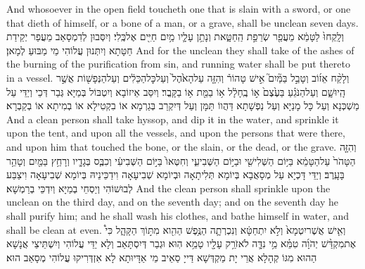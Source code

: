 {And whosoever in the open field toucheth one that is slain with a sword, or one that dieth of himself, or a bone of a man, or a grave, shall be unclean seven days.}{}
{וְלָֽקְחוּ֙ לַטָּמֵ֔א מֵעֲפַ֖ר שְׂרֵפַ֣ת הַֽחַטָּ֑את וְנָתַ֥ן עָלָ֛יו מַ֥יִם חַיִּ֖ים אֶל\maqqaf כֶּֽלִי׃}
{וְיִסְּבוּן לְדִמְסָאַב מֵעֲפַר יְקֵידַת חַטָּתָא וְיִתְּנוּן עֲלוֹהִי מֵי מַבּוּעַ לְמָאן׃}
{And for the unclean they shall take of the ashes of the burning of the purification from sin, and running water shall be put thereto in a vessel.}{}
{וְלָקַ֨ח אֵז֜וֹב וְטָבַ֣ל בַּמַּ֘יִם֮ אִ֣ישׁ טָהוֹר֒ וְהִזָּ֤ה עַל\maqqaf הָאֹ֙הֶל֙ וְעַל\maqqaf כׇּל\maqqaf הַכֵּלִ֔ים וְעַל\maqqaf הַנְּפָשׁ֖וֹת אֲשֶׁ֣ר הָֽיוּ\maqqaf שָׁ֑ם וְעַל\maqqaf הַנֹּגֵ֗עַ בַּעֶ֙צֶם֙ א֣וֹ בֶֽחָלָ֔ל א֥וֹ בַמֵּ֖ת א֥וֹ בַקָּֽבֶר׃}
{וְיִסַּב אֵיזוֹבָא וְיִטְבּוֹל בְּמַיָּא גְּבַר דְּכֵי וְיַדֵּי עַל מַשְׁכְּנָא וְעַל כָּל מָנַיָּא וְעַל נַפְשָׁתָא דַּהֲווֹ תַּמָּן וְעַל דְּיִקְרַב בְּגַרְמָא אוֹ בִקְטִילָא אוֹ בְמִיתָא אוֹ בְקַבְרָא׃}
{And a clean person shall take hyssop, and dip it in the water, and sprinkle it upon the tent, and upon all the vessels, and upon the persons that were there, and upon him that touched the bone, or the slain, or the dead, or the grave.}{}
{וְהִזָּ֤ה הַטָּהֹר֙ עַל\maqqaf הַטָּמֵ֔א בַּיּ֥וֹם הַשְּׁלִישִׁ֖י וּבַיּ֣וֹם הַשְּׁבִיעִ֑י וְחִטְּאוֹ֙ בַּיּ֣וֹם הַשְּׁבִיעִ֔י וְכִבֶּ֧ס בְּגָדָ֛יו וְרָחַ֥ץ בַּמַּ֖יִם וְטָהֵ֥ר בָּעָֽרֶב׃}
{וְיַדֵּי דָּכְיָא עַל מְסָאֲבָא בְּיוֹמָא תְּלִיתָאָה וּבְיוֹמָא שְׁבִיעָאָה וִידַכֵּינֵיהּ בְּיוֹמָא שְׁבִיעָאָה וִיצַבַּע לְבוּשׁוֹהִי וְיַסְחֵי בְמַיָּא וְיִדְכֵּי בְרַמְשָׁא׃}
{And the clean person shall sprinkle upon the unclean on the third day, and on the seventh day; and on the seventh day he shall purify him; and he shall wash his clothes, and bathe himself in water, and shall be clean at even.}{}
{וְאִ֤ישׁ אֲשֶׁר\maqqaf יִטְמָא֙ וְלֹ֣א יִתְחַטָּ֔א וְנִכְרְתָ֛ה הַנֶּ֥פֶשׁ הַהִ֖וא מִתּ֣וֹךְ הַקָּהָ֑ל כִּי֩ אֶת\maqqaf מִקְדַּ֨שׁ יְהֹוָ֜ה טִמֵּ֗א מֵ֥י נִדָּ֛ה לֹא\maqqaf זֹרַ֥ק עָלָ֖יו טָמֵ֥א הֽוּא׃}
{וּגְבַר דְּיִסְתָּאַב וְלָא יַדֵּי עֲלוֹהִי וְיִשְׁתֵּיצֵי אֲנָשָׁא הַהוּא מִגּוֹ קְהָלָא אֲרֵי יָת מַקְדְּשָׁא דַּייָ סַאֵיב מֵי אַדָּיוּתָא לָא אִזְדְּרִיקוּ עֲלוֹהִי מְסָאַב הוּא׃}
